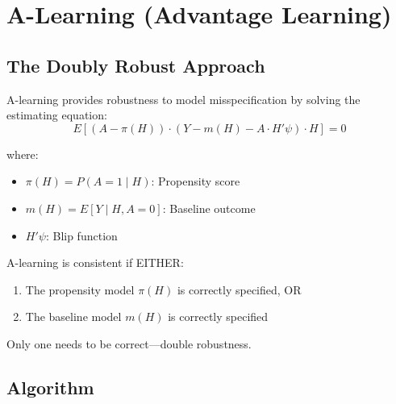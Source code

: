 \section{A-Learning (Advantage Learning)}

\subsection{The Doubly Robust Approach}

A-learning provides robustness to model misspecification by solving the estimating equation:
\begin{equation}
E\left[(A - \pi(H)) \cdot (Y - m(H) - A \cdot H'\psi) \cdot H\right] = 0
\end{equation}

where:
\begin{itemize}
\item $\pi(H) = P(A = 1 \mid H)$: Propensity score
\item $m(H) = E[Y \mid H, A = 0]$: Baseline outcome
\item $H'\psi$: Blip function
\end{itemize}

\begin{proposition}
A-learning is consistent if EITHER:
\begin{enumerate}
\item The propensity model $\pi(H)$ is correctly specified, OR
\item The baseline model $m(H)$ is correctly specified
\end{enumerate}
Only one needs to be correct---double robustness.
\end{proposition}

\subsection{Algorithm}

